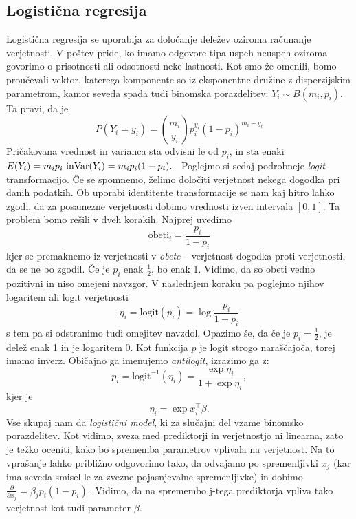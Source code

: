 \documentclass[12pt,a4paper]{amsart}
\theoremstyle{definition} %
\theoremstyle{plain} %
\begin{document}
\subsection{Logistična regresija}
Logistična regresija se uporablja za določanje deležev oziroma računanje verjetnosti. V poštev pride, ko imamo odgovore tipa uspeh-neuspeh oziroma
govorimo o prisotnosti ali odsotnosti neke lastnosti. Kot smo že omenili, bomo proučevali vektor, katerega komponente so iz eksponentne družine z disperzijskim parametrom,
kamor seveda spada tudi binomska porazdelitev: $Y_{i} \sim B(m_{i}, p_{i})$. Ta pravi, da je 
\[
    P(Y_{i} = y_{i}) = {m_{i} \choose y_{i}} p_{i}^{y_{i}}(1 - p_{i}) ^{m_{i} - y_{i}}
\]
Pričakovana vrednost in varianca sta odvisni le od $p_{i}$, in sta enaki $E(Y_{i}) = m_{i}p_{i} \text{~in}\\\mathrm{Var}(Y_{i}) = m_{i}p_{i}(1 - p_{i}).$~
Poglejmo si sedaj podrobneje \textit{logit} transformacijo. Če se spomnemo, želimo določiti verjetnost nekega dogodka pri danih podatkih. Ob uporabi
identitente transformacije se nam kaj hitro lahko zgodi, da za posamezne verjetnosti dobimo vrednosti izven intervala $[0,1]$. Ta problem bomo rešili v 
dveh korakih.
Najprej uvedimo 
\[ 
    \mathrm{obeti}_{i} = \frac{p_{i}}{1 - p_{i}} %
\]
kjer se premaknemo iz verjetnosti v \textit{obete} -- verjetnost dogodka proti verjetnosti, da se ne bo zgodil. Če je $p_{i}$ enak $\frac{1}{2}$, 
bo enak 1. Vidimo, da so obeti vedno pozitivni in niso omejeni navzgor.
V naslednjem koraku pa poglejmo njihov logaritem ali logit verjetnosti
\[
    \eta_{i} = \mathrm{logit}(p_{i}) = \log \frac{p_{i}}{1 - p_{i}}
\]
s tem pa si odstranimo tudi omejitev navzdol. Opazimo še, da če je $p_{i} = \frac{1}{2}$, je delež enak 1 in je logaritem 0. Kot funkcija $p$ je logit
strogo naraščajoča, torej imamo inverz. Običajno ga imenujemo \textit{antilogit}, izrazimo ga z:
\begin{equation}\label{p_i}
    p_{i} = \mathrm{logit}^{-1}(\eta_{i}) = \frac{\exp{\eta_{i}}}{1+\exp{\eta_{i}}},
\end{equation}
kjer je
\[
    \eta_{i} = \exp{x_{i}^\top\beta}.
\]
Vse skupaj nam da \textit{logistični model}, ki za slučajni del vzame binomsko porazdelitev. %
Kot vidimo, zveza med prediktorji in verjetnostjo ni linearna, zato je težko oceniti, kako bo sprememba parametrov
vplivala na verjetnost. Na to vprašanje lahko približno odgovorimo tako, da odvajamo po spremenljivki $x_{j}$ (kar ima seveda smisel le za zvezne
pojasnjevalne spremenljivke) in dobimo $\tfrac{\partial}{\partial x_{j}} = \beta_{j}p_{i}(1 - p_{i}).$~Vidimo, da na spremembo j-tega prediktorja
vpliva tako verjetnost kot tudi parameter $\beta$.
\end{document}
